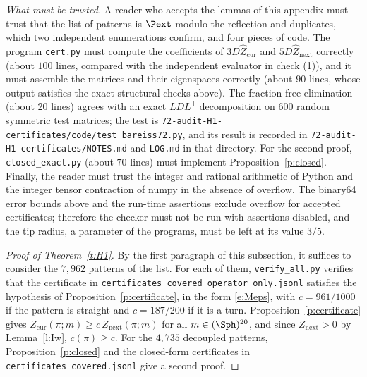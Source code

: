 \emph{What must be trusted.} A reader who accepts the lemmas of this appendix must trust that the list of patterns is $\Pext$ modulo the reflection and duplicates, which two independent enumerations confirm, and four pieces of code. The program \texttt{cert.py} must compute the coefficients of $3 D \hat Z_{\mathrm{cur}}$ and $5 D \hat Z_{\mathrm{next}}$ correctly (about $100$ lines, compared with the independent evaluator in check (1)), and it must assemble the matrices and their eigenspaces correctly (about $90$ lines, whose output satisfies the exact structural checks above). The fraction-free elimination (about $20$ lines) agrees with an exact $LDL^{\mathsf T}$ decomposition on $600$ random symmetric test matrices; the test is \texttt{72-audit-H1-certificates/\allowbreak code/\allowbreak test\_\allowbreak bareiss72.py}, and its result is recorded in \texttt{72-audit-H1-certificates/\allowbreak NOTES.md} and \texttt{LOG.md} in that directory. For the second proof, \texttt{closed\_exact.py} (about $70$ lines) must implement Proposition~\ref{p:closed}. Finally, the reader must trust the integer and rational arithmetic of Python and the integer tensor contraction of numpy in the absence of overflow. The binary64 error bounds above and the run-time assertions exclude overflow for accepted certificates; therefore the checker must not be run with assertions disabled, and the tip radius, a parameter of the programs, must be left at its value $3/5$.

\begin{proof}[Proof of Theorem~\ref{t:H1}]
By the first paragraph of this subsection, it suffices to consider the $7{,}962$ patterns of the list. For each of them, \texttt{verify\_all.py} verifies that the certificate in \texttt{certificates\_\allowbreak covered\_\allowbreak operator\_\allowbreak only.jsonl} satisfies the hypothesis of Proposition~\ref{p:certificate}, in the form \eqref{e:Meps}, with $c = 961/1000$ if the pattern is straight and $c = 187/200$ if it is a turn. Proposition~\ref{p:certificate} gives $Z_{\mathrm{cur}}(\pi; m) \ge c \, Z_{\mathrm{next}}(\pi; m)$ for all $m \in (\Sph)^{20}$, and since $Z_{\mathrm{next}} > 0$ by Lemma~\ref{l:Iw}, $c(\pi) \ge c$. For the $4{,}735$ decoupled patterns, Proposition~\ref{p:closed} and the closed-form certificates in \texttt{certificates\_\allowbreak covered.jsonl} give a second proof.
\end{proof}
